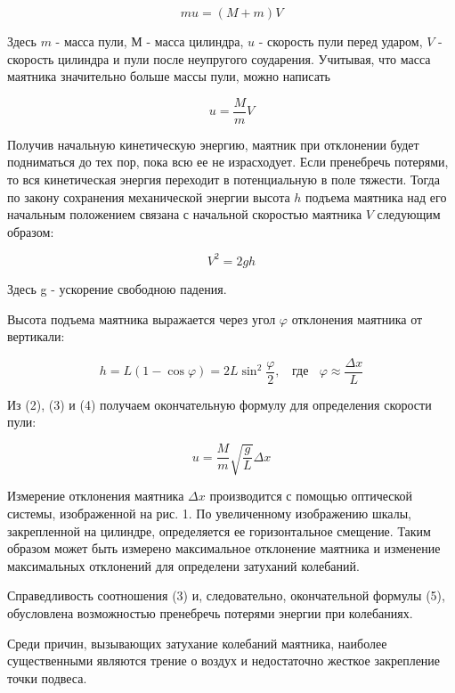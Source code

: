 \documentclass[14pt]{article}
\begin{document}
\begin{equation}
mu = (M + m)V
\end{equation}

\noindent Здесь $m$ - масса пули, $М$ - масса цилиндра, $u$ - скорость пули перед ударом, $V$ - скорость цилиндра и пули после неупругого соударения. Учитывая, что масса маятника значительно больше массы пули, можно написать 

\begin{equation}
u = \frac{M}{m}V
\end{equation}

Получив начальную кинетическую энергию, маятник при отклонении будет подниматься до тех пор, пока всю ее не израсходует. Если пренебречь потерями, то вся кинетическая энергия переходит в потенциальную в поле тяжести. Тогда по закону сохранения механической энергии высота $h$ подъема маятника над его начальным положением связана с начальной скоростью маятника $V$ следующим образом:

\begin{equation}
V^2 = 2gh
\end{equation}

\noindent Здесь g - ускорение свободною падения.


Высота подъема маятника выражается через угол $\varphi$ отклонения маятника от вертикали:

\begin{equation}
h = L(1 - \cos\varphi) = 2L\sin^2\frac{\varphi}{2},~~~~\text{где}~~~~\varphi \approx \frac{\Delta x}{L}
\end{equation}

Из (2), (3) и (4) получаем окончательную формулу для определения скорости пули:

\begin{equation}
u = \frac{M}{m}\sqrt{\frac{g}{L}}\Delta x
\end{equation}

Измерение отклонения маятника $\Delta x$ производится с помощью оптической системы, изображенной на рис. 1. По увеличенному изображению шкалы, закрепленной на цилиндре, определяется ее горизонтальное смещение. Таким образом может быть измерено максимальное отклонение маятника и изменение максимальных отклонений для определени затуханий колебаний.

Справедливость соотношения (3) и, следовательно, окончательной формулы (5), обусловлена возможностью пренебречь потерями энергии при колебаниях.

Среди причин, вызывающих затухание колебаний маятника, наиболее существенными являются трение о воздух и недостаточно жесткое закрепление точки подвеса.
\end{document}
